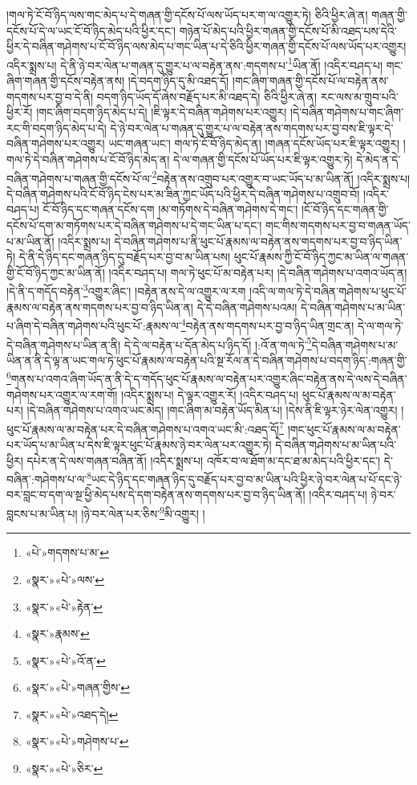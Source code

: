 །གལ་ཏེ་ངོ་བོ་ཉིད་ལས་གང་མེད་པ་དེ་གཞན་གྱི་དངོས་པོ་ལས་ཡོད་པར་ག་ལ་འགྱུར་ཏེ། ཅིའི་ཕྱིར་ཞེ་ན། གཞན་གྱི་དངོས་པོ་དེ་ལ་ཡང་ངོ་བོ་ཉིད་མེད་པའི་ཕྱིར་དང་། གཉེན་པོ་མེད་པའི་ཕྱིར་གཞན་གྱི་དངོས་པོ་མི་འཐད་པས་དེའི་ཕྱིར་དེ་བཞིན་གཤེགས་པ་ངོ་བོ་ཉིད་ལས་མེད་པ་གང་ཡིན་པ་དེ་ཅིའི་ཕྱིར་གཞན་གྱི་དངོས་པོ་ལས་ཡོད་པར་འགྱུར། འདིར་སྨྲས་པ། དེ་ནི་ཉེ་བར་ལེན་པ་གཞན་དུ་གྱུར་པ་ལ་བརྟེན་ནས་:གདགས་པ་\footnote{«པེ་»གདགས་པ་མ་}ཡིན་ནོ། །འདིར་བཤད་པ། གང་ཞིག་གཞན་གྱི་དངོས་བརྟེན་ནས། །དེ་བདག་ཉིད་དུ་མི་འཐད་དོ། །གང་ཞིག་གཞན་གྱི་དངོས་པོ་ལ་བརྟེན་ནས་གདགས་པར་བྱ་བ་དེ་ནི། བདག་ཉིད་ཡོད་དོ་ཞེས་བརྗོད་པར་མི་འཐད་དེ། ཅིའི་ཕྱིར་ཞེ་ན། རང་ལས་མ་གྲུབ་པའི་ཕྱིར་རོ། །གང་ཞིག་བདག་ཉིད་མེད་པ་དེ། །ཇི་ལྟར་དེ་བཞིན་གཤེགས་པར་འགྱུར། །དེ་བཞིན་གཤེགས་པ་གང་ཞིག་རང་གི་བདག་ཉིད་མེད་པ་དེ། དེ་ཉེ་བར་ལེན་པ་གཞན་དུ་གྱུར་པ་ལ་བརྟེན་ནས་གདགས་པར་བྱ་བས་ཇི་ལྟར་དེ་བཞིན་གཤེགས་པར་འགྱུར། ཡང་གཞན་ཡང་། གལ་ཏེ་ངོ་བོ་ཉིད་མེད་ན། །གཞན་དངོས་ཡོད་པར་ཇི་ལྟར་འགྱུར། །གལ་ཏེ་དེ་བཞིན་གཤེགས་པ་ངོ་བོ་ཉིད་མེད་ན། དེ་ལ་གཞན་གྱི་དངོས་པོ་ཡོད་པར་ཇི་ལྟར་འགྱུར་ཏེ། དེ་མེད་ན་དེ་བཞིན་གཤེགས་པ་གཞན་གྱི་དངོས་པོ་ལ་\footnote{«སྣར་»«པེ་»ལས་}བརྟེན་ནས་འགྲུབ་པར་འགྱུར་བ་ཡང་ཡོད་པ་མ་ཡིན་ནོ། །འདིར་སྨྲས་པ། དེ་བཞིན་གཤེགས་པའི་ངོ་བོ་ཉིད་ངེས་པར་མ་ཟིན་ཀྱང་ཡོད་པའི་ཕྱིར་དེ་བཞིན་གཤེགས་པ་འགྲུབ་བོ། །འདིར་བཤད་པ། ངོ་བོ་ཉིད་དང་གཞན་དངོས་དག །མ་གཏོགས་དེ་བཞིན་གཤེགས་དེ་གང་། །ངོ་བོ་ཉིད་དང་གཞན་གྱི་དངོས་པོ་དག་མ་གཏོགས་པར་དེ་བཞིན་གཤེགས་པ་དེ་གང་ཡིན་པ་དང་། གང་གིས་གདགས་པར་བྱ་བ་གཞན་ཡོད་པ་མ་ཡིན་ནོ། །འདིར་སྨྲས་པ། དེ་བཞིན་གཤེགས་པ་ནི་ཕུང་པོ་རྣམས་ལ་བརྟེན་ནས་གདགས་པར་བྱ་བ་ཉིད་ཡིན་ཏེ། དེ་ནི་དེ་ཉིད་དང་གཞན་ཉིད་དུ་བརྗོད་པར་བྱ་བ་མ་ཡིན་པས། ཕུང་པོ་རྣམས་ཀྱི་ངོ་བོ་ཉིད་ཀྱང་མ་ཡིན་ལ་གཞན་གྱི་ངོ་བོ་ཉིད་ཀྱང་མ་ཡིན་ནོ། །འདིར་བཤད་པ། གལ་ཏེ་ཕུང་པོ་མ་བརྟེན་པར། །དེ་བཞིན་གཤེགས་པ་འགའ་ཡོད་ན། །དེ་ནི་ད་གདོད་བརྟེན་\footnote{«སྣར་»«པེ་»རྟེན་}འགྱུར་ཞིང་། །བརྟེན་ནས་དེ་ལ་འགྱུར་ལ་རག །འདི་ལ་གལ་ཏེ་དེ་བཞིན་གཤེགས་པ་ཕུང་པོ་རྣམས་ལ་བརྟེན་ནས་གདགས་པར་བྱ་བ་ཉིད་ཡིན་ན། དེ་དེ་བཞིན་གཤེགས་པའམ། དེ་བཞིན་གཤེགས་པ་མ་ཡིན་པ་ཞིག་དེ་བཞིན་གཤེགས་པའི་ཕུང་པོ་:རྣམས་ལ་\footnote{«སྣར་»རྣམས་}བརྟེན་ནས་གདགས་པར་བྱ་བ་ཉིད་ཡིན་གྲང་ན། དེ་ལ་གལ་ཏེ་དེ་བཞིན་གཤེགས་པ་ཡིན་ན་ནི། དེ་དེ་ལ་བརྟེན་པ་དོན་མེད་པ་ཉིད་དོ། །:འོ་ན་གལ་ཏེ་\footnote{«སྣར་»«པེ་»འོ་ན་}དེ་བཞིན་གཤེགས་པ་མ་ཡིན་ན་ནི་དེ་ལྟ་ན་ཡང་གལ་ཏེ་ཕུང་པོ་རྣམས་ལ་བརྟེན་པའི་སྔ་རོལ་ན་དེ་བཞིན་གཤེགས་པ་བདག་ཉིད་:གཞན་གྱི་\footnote{«སྣར་»«པེ་»གཞན་གྱིས་}གནས་པ་འགའ་ཞིག་ཡོད་ན་ནི་དེ་ད་གདོད་ཕུང་པོ་རྣམས་ལ་བརྟེན་པར་འགྱུར་ཞིང་བརྟེན་ནས་དེ་ལས་དེ་བཞིན་གཤེགས་པར་འགྱུར་ལ་རག་གོ། །འདིར་སྨྲས་པ། དེ་ལྟར་འགྱུར་རོ། །འདིར་བཤད་པ། ཕུང་པོ་རྣམས་ལ་མ་བརྟེན་པར། །དེ་བཞིན་གཤེགས་པ་འགའ་ཡང་མེད། །གང་ཞིག་མ་བརྟེན་ཡོད་མིན་པ། །དེས་ནི་ཇི་ལྟར་ཉེར་ལེན་འགྱུར། །ཕུང་པོ་རྣམས་ལ་མ་བརྟེན་པར་དེ་བཞིན་གཤེགས་པ་འགའ་ཡང་མི་:འཐད་དོ།\footnote{«སྣར་»«པེ་»འཐད་དེ།} །གང་ཕུང་པོ་རྣམས་ལ་མ་བརྟེན་པར་ཡོད་པ་མ་ཡིན་པ་དེས་ཇི་ལྟར་ཕུང་པོ་རྣམས་ཉེ་བར་ལེན་པར་འགྱུར་ཏེ། དེ་བཞིན་གཤེགས་པ་མ་ཡིན་པའི་ཕྱིར། དཔེར་ན་དེ་ལས་གཞན་བཞིན་ནོ། །འདིར་སྨྲས་པ། འཁོར་བ་ལ་ཐོག་མ་དང་ཐ་མ་མེད་པའི་ཕྱིར་དང་། དེ་བཞིན་:གཤེགས་པ་ལ་\footnote{«སྣར་»«པེ་»གཤེགས་པ་}ཡང་དེ་ཉིད་དང་གཞན་ཉིད་དུ་བརྗོད་པར་བྱ་བ་མ་ཡིན་པའི་ཕྱིར་ཉེ་བར་ལེན་པ་པོ་དང་ཉེ་བར་བླང་བ་དག་ལ་སྔ་ཕྱི་མེད་པས་དེ་དག་བརྟེན་ནས་གདགས་པར་བྱ་བ་ཉིད་ཡིན་ནོ། །འདིར་བཤད་པ། ཉེ་བར་བླངས་པ་མ་ཡིན་པ། །ཉེ་བར་ལེན་པར་ཅིས་\footnote{«སྣར་»«པེ་»ཅིར་}མི་འགྱུར། །
